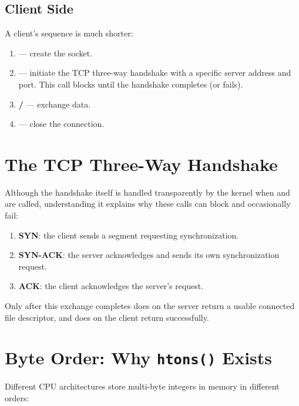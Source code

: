 \subsection{Client Side}

A client's sequence is much shorter:

\begin{enumerate}
    \item \textbf{} --- create the socket.
    \item \textbf{} --- initiate the TCP three-way handshake with a specific server address and port. This call blocks until the handshake completes (or fails).
    \item \textbf{ / } --- exchange data.
    \item \textbf{} --- close the connection.
\end{enumerate}

\section{The TCP Three-Way Handshake}

Although the handshake itself is handled transparently by the kernel when  and  are called, understanding it explains why these calls can block and occasionally fail:

\begin{enumerate}
    \item \textbf{SYN}: the client sends a segment requesting synchronization.
    \item \textbf{SYN-ACK}: the server acknowledges and sends its own synchronization request.
    \item \textbf{ACK}: the client acknowledges the server's request.
\end{enumerate}

Only after this exchange completes does  on the server return a usable connected file descriptor, and does  on the client return successfully.

\section{Byte Order: Why \texttt{htons()} Exists}

Different CPU architectures store multi-byte integers in memory in different orders:

